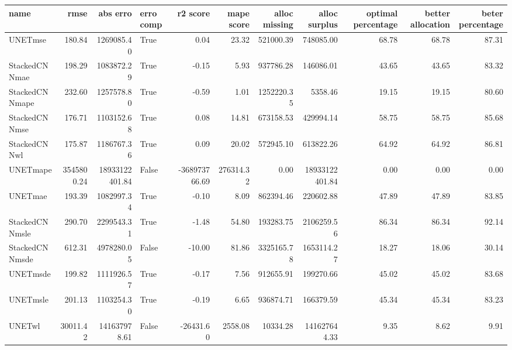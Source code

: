 \begin{tabular}{lrrlrrrrrrr}
\toprule
name & rmse & abs erro & erro comp & r2 score & mape score & alloc missing & alloc surplus & optimal percentage & better allocation & beter percentage \\
\midrule
UNETmse & 180.84 & 1269085.40 & True & 0.04 & 23.32 & 521000.39 & 748085.00 & 68.78 & 68.78 & 87.31 \\
StackedCNNmae & 198.29 & 1083872.29 & True & -0.15 & 5.93 & 937786.28 & 146086.01 & 43.65 & 43.65 & 83.32 \\
StackedCNNmape & 232.60 & 1257578.80 & True & -0.59 & 1.01 & 1252220.35 & 5358.46 & 19.15 & 19.15 & 80.60 \\
StackedCNNmse & 176.71 & 1103152.68 & True & 0.08 & 14.81 & 673158.53 & 429994.14 & 58.75 & 58.75 & 85.68 \\
StackedCNNwl & 175.87 & 1186767.36 & True & 0.09 & 20.02 & 572945.10 & 613822.26 & 64.92 & 64.92 & 86.81 \\
UNETmape & 3545800.24 & 18933122401.84 & False & -368973766.69 & 276314.32 & 0.00 & 18933122401.84 & 0.00 & 0.00 & 0.00 \\
UNETmae & 193.39 & 1082997.34 & True & -0.10 & 8.09 & 862394.46 & 220602.88 & 47.89 & 47.89 & 83.85 \\
StackedCNNmsle & 290.70 & 2299543.31 & True & -1.48 & 54.80 & 193283.75 & 2106259.56 & 86.34 & 86.34 & 92.14 \\
StackedCNNmsde & 612.31 & 4978280.05 & False & -10.00 & 81.86 & 3325165.78 & 1653114.27 & 18.27 & 18.06 & 30.14 \\
UNETmsde & 199.82 & 1111926.57 & True & -0.17 & 7.56 & 912655.91 & 199270.66 & 45.02 & 45.02 & 83.68 \\
UNETmsle & 201.13 & 1103254.30 & True & -0.19 & 6.65 & 936874.71 & 166379.59 & 45.34 & 45.34 & 83.23 \\
UNETwl & 30011.42 & 141637978.61 & False & -26431.60 & 2558.08 & 10334.28 & 141627644.33 & 9.35 & 8.62 & 9.91 \\
\bottomrule
\end{tabular}

